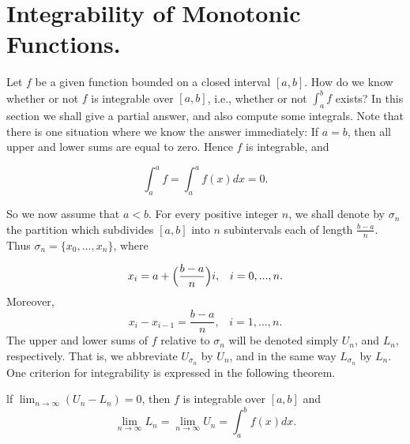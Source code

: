\section{Integrability of Monotonic Functions.}
 Let $f$ be a given function bounded on a closed interval $[a, b]$. How do we know whether or not $f$ is integrable over $[a, b]$, i.e., whether or not $\int_{a}^{b} f$ exists? In this section we shall give a partial answer, and also compute some integrals. Note that there is one situation where we know the answer immediately: If $a = b$, then all upper and lower sums are equal to zero. Hence $f$ is integrable, and

\begin{theorem} %
$$
\int_{a}^{a} f = \int_{a}^{a}  f (x) dx = 0.  
$$
\end{theorem}

So we now assume that $a < b$. For every positive integer $n$, we shall denote by $\sigma_n$ the partition which subdivides $[a, b]$ into $n$ subintervals each of length $\frac{b - a}{n}$. Thus $\sigma_n = \{x_0,... , x_n
\}$, where

$$
x_i = a + \Bigl( \frac{b - a}{n} \Bigr)i,        \;\;\;     i = 0,..., n.
$$
\noindent Moreover,
$$
x_i - x_{i - 1} = \frac{b - a}{n},        \;\;\;     i = 1,..., n.
$$
\noindent The upper and lower sums of $f$ relative to $\sigma_n$ will be denoted simply $U_n$, and $L_n$, respectively. That is, we abbreviate $U_{\sigma_n}$ by $U_n$, and in the same way $L_{\sigma_n}$ by $L_n$. One criterion for integrability is expressed in the following theorem.

\begin{theorem} %
lf $\lim_{n \rightarrow \infty} (U_n - L_n) = 0$, then $f$ is integrable over $[a, b]$ and  
$$
\lim_{n \rightarrow \infty} L_n = \lim_{n \rightarrow \infty} U_n = \int_{a}^{b} f(x) dx.  
$$
\end{theorem}

